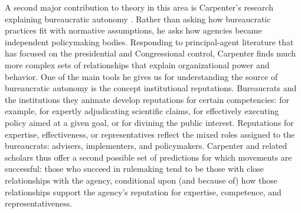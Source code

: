
A second major contribution to theory in this area is Carpenter's  research explaining bureaucratic autonomy \citep{Carpenter2001,Carpenter2012}. Rather than asking how bureaucratic practices fit with normative assumptions, he asks how agencies became independent policymaking bodies. Responding to principal-agent literature that has focused on the presidential and Congressional control, Carpenter finds much more complex sets of relationships that explain organizational power and behavior. One of the main tools he gives us for understanding the source of bureaucratic autonomy is the concept institutional reputations. Bureaucrats and the institutions they animate develop reputations for certain competencies: for example, for expertly adjudicating scientific claims, for effectively executing policy aimed at a given goal, or for divining the public interest. Reputations for expertise, effectiveness, or representatives reflect the mixed roles assigned to the bureaucrats: advisers, implementers, and policymakers. 
Carpenter and related scholars thus offer a second possible set of predictions for which movements are successful: those who succeed in rulemaking tend to be those with close relationships with the agency, conditional upon (and because of) how those relationships support the agency's reputation for expertise, competence, and representativeness. %

